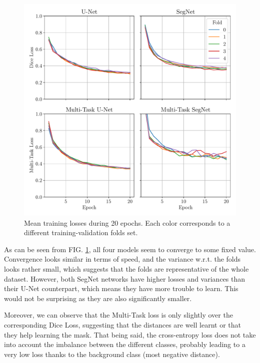 \documentclass[twocolumn,superscriptaddress,aps,nofootinbib]{revtex4-1}
\begin{document}
\begin{figure}[h]
    \centering
    \vspace{-1em}
    \includegraphics[width=\columnwidth]{resources/pdf/convergence.pdf}
    \vspace{-2em}
    \caption{Mean training losses during 20 epochs. Each color corresponds to a different training-validation folds set.}
    \label{fig:convergence}
\end{figure}

As can be seen from FIG. \ref{fig:convergence}, all four models seem to converge to some fixed value. Convergence looks similar in terms of speed, and the variance w.r.t. the folds looks rather small, which suggests that the folds are representative of the whole dataset. However, both SegNet networks have higher losses and variances than their U-Net counterpart, which means they have more trouble to learn. This would not be surprising as they are also significantly smaller.

Moreover, we can observe that the Multi-Task loss is only slightly over the corresponding Dice Loss, suggesting that the distances are well learnt or that they help learning the mask. That being said, the cross-entropy loss does not take into account the imbalance between the different classes, probably leading to a very low loss thanks to the background class (most negative distance).
\end{document}
